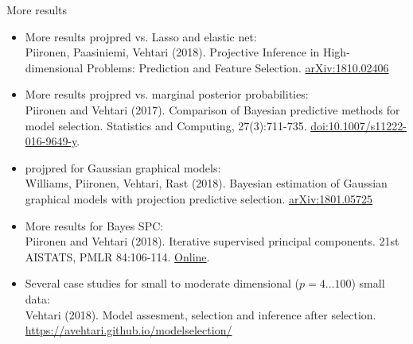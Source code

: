 \documentclass[english,t]{beamer}
\begin{document}
\begin{frame}
  
  {\Large\color{navyblue} More results}\\

  {\footnotesize
  \begin{itemize}
  \item More results projpred vs. Lasso and elastic net:\\
    Piironen, Paasiniemi, Vehtari (2018). Projective Inference in
    High-dimensional Problems: Prediction and Feature Selection.
    \href{https://arxiv.org/abs/arXiv:1810.02406}{arXiv:1810.02406}
  \item More results projpred vs. marginal posterior probabilities:\\
    Piironen and Vehtari (2017). Comparison of Bayesian predictive
    methods for model selection. Statistics and Computing,
    27(3):711-735.
    \href{https://dx.doi.org/10.1007/s11222-016-9649-y}{doi:10.1007/s11222-016-9649-y}.
  \item projpred for Gaussian graphical models:\\
    Williams, Piironen, Vehtari, Rast (2018). Bayesian estimation of Gaussian graphical models with projection predictive selection. \href{https://arxiv.org/abs/1801.05725}{arXiv:1801.05725}
  \item More results for Bayes SPC:\\
    Piironen and Vehtari (2018). Iterative supervised principal components. 21st AISTATS, PMLR 84:106-114. \href{http://proceedings.mlr.press/v84/piironen18a.html}{Online}.
  \item Several case studies for small to moderate dimensional ($p=4 \ldots 100$) small data:\\
    Vehtari (2018). Model assesment, selection and inference after
    selection. \url{https://avehtari.github.io/modelselection/}
  \end{itemize}
  }
\end{frame}
\end{document}
